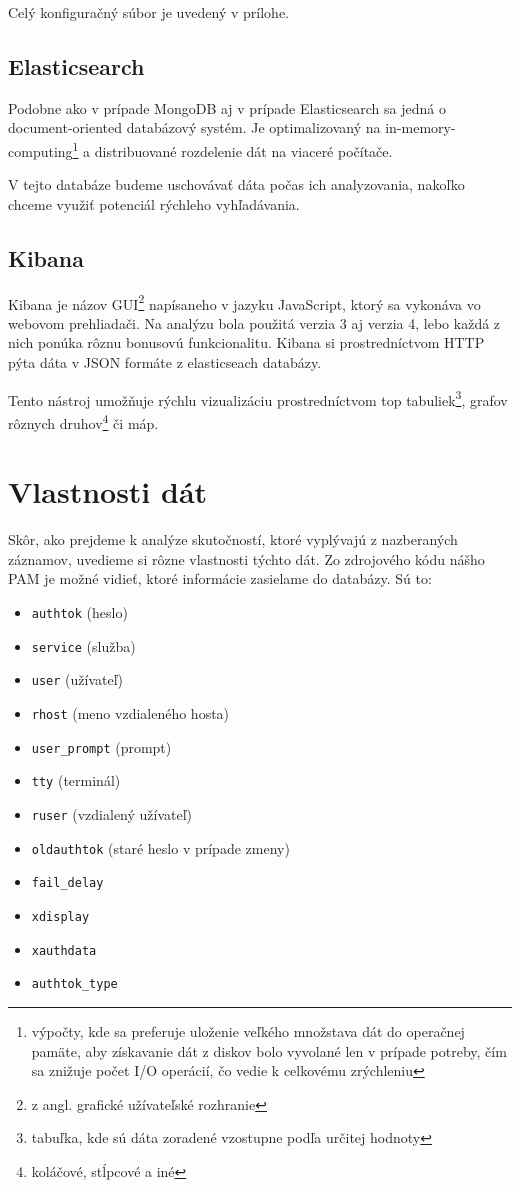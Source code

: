 \documentclass[12pt, oneside]{book}
\begin{document}
Celý konfiguračný súbor je uvedený v prílohe.

\subsection{Elasticsearch}
Podobne ako v prípade MongoDB aj v prípade Elasticsearch sa jedná o document-oriented databázový systém.
Je optimalizovaný na in-memory-computing\footnote{výpočty, kde sa preferuje uloženie veľkého množstava dát do operačnej pamäte, aby získavanie dát z diskov bolo vyvolané len v prípade potreby, čím sa znižuje počet I/O operácií, čo vedie k celkovému zrýchleniu} a distribuované rozdelenie dát na viaceré počítače.

V tejto databáze budeme uschovávať dáta počas ich analyzovania, nakoľko chceme využiť potenciál rýchleho vyhľadávania.

\subsection{Kibana}
Kibana je názov GUI\footnote{z angl. grafické užívateľské rozhranie} napísaneho v jazyku JavaScript, ktorý sa vykonáva vo webovom prehliadači.
Na analýzu bola použitá verzia 3 aj verzia 4, lebo každá z nich ponúka rôznu bonusovú funkcionalitu.
Kibana si prostredníctvom HTTP pýta dáta v JSON formáte z elasticseach databázy.

Tento nástroj umožňuje rýchlu vizualizáciu prostredníctvom top tabuliek\footnote{tabuľka, kde sú dáta zoradené vzostupne podľa určitej hodnoty}, grafov rôznych druhov\footnote{koláčové, stĺpcové a iné} či máp.

\section{Vlastnosti dát}
Skôr, ako prejdeme k analýze skutočností, ktoré vyplývajú z nazberaných záznamov, uvedieme si rôzne vlastnosti týchto dát.
Zo zdrojového kódu nášho PAM je možné vidieť, ktoré informácie zasielame do databázy. 
Sú to:
\begin{itemize}
\item \texttt{authtok} (heslo)
\item \texttt{service} (služba)
\item \texttt{user} (užívateľ)
\item \texttt{rhost} (meno vzdialeného hosta)
\item \texttt{user\_prompt} (prompt)
\item \texttt{tty} (terminál)
\item \texttt{ruser} (vzdialený užívateľ)
\item \texttt{oldauthtok} (staré heslo v prípade zmeny)
\item \texttt{fail\_delay}
\item \texttt{xdisplay}
\item \texttt{xauthdata}
\item \texttt{authtok\_type}
\end{itemize}
\end{document}
